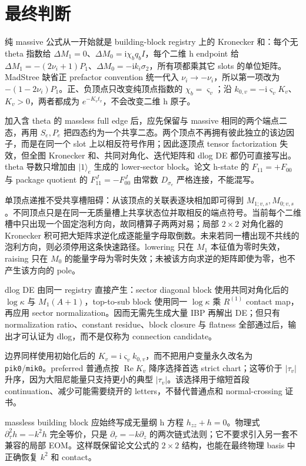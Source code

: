 \documentclass[11pt,a4paper]{ctexart}
\newcommand{\ii}{\mathrm i}
\begin{document}
\section{最终判断}

纯 massive 公式从一开始就是 building-block registry 上的 Kronecker 和：每个无 theta 指数给 $\Delta M_1=0$、$\Delta M_0=\ii\chi_bq_bI$，每个二维 h endpoint 给 $\Delta M_1=-(2\nu_i+1)P_1$、$\Delta M_0=-\ii k_i\sigma_2$，所有项都乘其它 slots 的单位矩阵。MadStree 缺省正 prefactor convention 统一代入 $\nu_i\to-\nu_i$，所以第一项改为 $-(1-2\nu_i)P_1$。正、负顶点只改变纯顶点指数的 $\chi_b=\varsigma_v$；沿 $k_{0,v}=-\ii\varsigma_vK_v$、$K_v>0$，两者都成为 $e^{-K_vt_v}$，不会改变二维 h 原子。

加入含 theta 的 massless full edge 后，应先保留与 massive 相同的两个端点二态，再用 $S_e,P_e$ 把四态约为一个共享二态。两个顶点不再拥有彼此独立的该边因子，而是在同一个 slot 上以相反符号作用；因此逐顶点 tensor factorization 失效，但全图 Kronecker 和、共同对角化、迭代矩阵和 dlog DE 都仍可直接写出。theta 导数只增加由 $|1\rangle_e$ 生成的 lower-sector block。论文 h-state 的 $F_{11}=+F_{00}$ 与 package quotient 的 $F_{11}^J=-F_{00}^J$ 由常数 $D_{\sigma_e}$ 严格连接，不能混写。

单顶点递推不受共享槽阻碍：从该顶点的关联表逐块相加即可得到 $M_{1;v,s},M_{0;v,s}$。不同顶点只是在同一无质量槽上共享状态位并取相反的端点符号。当前每个二维槽中只出现一个固定泡利方向，故同槽算子两两对易；局部 $2\times2$ 对角化器的 Kronecker 积可把大矩阵求逆化成逐能量字母取倒数。未来若同一槽出现不共线的泡利方向，则必须停用这条快速路径。lowering 只在 $M_1$ 本征值为零时失效，raising 只在 $M_0$ 的能量字母为零时失效；未被该方向求逆的矩阵即使为零，也不产生该方向的 pole。

dlog DE 由同一 registry 直接产生：sector diagonal block 使用共同对角化后的 $\log\kappa$ 与 $M_1(A+1)$，top-to-sub block 使用同一 $\log\kappa$ 乘 $R^{(1)}$ contact map，再应用 sector normalization。因而无需先生成大量 IBP 再解出 DE；但只有 normalization ratio、constant residue、block closure 与 flatness 全部通过后，输出才可认证为 dlog，而不是仅称为 connection candidate。

边界同样使用初始化后的 $K_v=\ii\varsigma_vk_{0,v}$，而不把用户变量永久改名为 \texttt{pik0}/\texttt{mik0}。preferred 普通点按 $\operatorname{Re}K_v$ 降序选择首选 strict chart；这等价于 $|\tau_v|$ 升序，因为大阻尼能量只支持更小的典型 $|\tau_v|$。该选择用于缩短首段 continuation、减少可能需要绕开的 letters，不替代普通点和 normal-crossing 证书。

massless building block 应始终写成无量纲 h 方程 $h_{zz}+h=0$。物理式 $\partial_\tau^2h=-k^2h$ 完全等价，只是 $\partial_\tau=-k\partial_z$ 的两次链式法则；它不要求引入另一套不兼容的局部 EOM。这样既保留论文公式的 $2\times2$ 结构，也能在最终物理 basis 中正确恢复 $k^2$ 和 contact。



\end{document}

